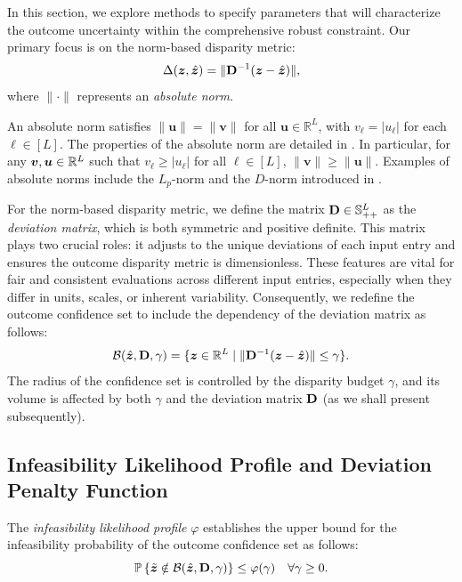 \documentclass[opre, nonblindrev]{informswp}
\newcommand{\1}[1]{\mathds{1}{\left(#1\right)}}
\begin{document}
In this section, we explore methods to specify parameters that will characterize the outcome uncertainty within the comprehensive robust constraint. Our primary focus is on the norm-based disparity metric:
$$
\Delta(\bm z,\hat{\bm{z}}) = \| {\mathbf{D}}^{-1} (\bm z - \hat{\bm{z}}) \|,
$$
where $\|\cdot\|$ represents an {\em absolute norm}. 

\begin{definition}
\textnormal{
An absolute norm satisfies $\|\bm u\| = \| \bm v\|$ for all $\bm u \in \mathbb{R}^L$, with $v_\ell = |u_\ell|$ for each $\ell \in [L]$. The properties of the absolute norm are detailed in \cite{bertsimas2006tractable}. In particular, for any $\bm v, \bm u \in \mathbb{R}^L$ such that $v_\ell\geq |u_\ell|$ for all $\ell \in [L]$, $\|\bm v\|\geq \|\bm u\|$. Examples of absolute norms include the $L_p$-norm and the $D$-norm introduced in \cite{bertsimas2004robust}.
}
\end{definition}

For the norm-based disparity metric, we define the matrix ${\mathbf{D}} \in \mathbb{S}^L_{++}$ as the {\em deviation matrix}, which is both symmetric and positive definite. This matrix plays two crucial roles: it adjusts to the unique deviations of each input entry and ensures the outcome disparity metric is dimensionless. These features are vital for fair and consistent evaluations across different input entries, especially when they differ in units, scales, or inherent variability. Consequently, we redefine the outcome confidence set to include the dependency of the deviation matrix as follows:
$$
\mathcal{B}(\hat{\bm{z}}, {\mathbf{D}}, \gamma) = \{ \bm z \in \mathbb{R}^L \;|\; \| {\mathbf{D}}^{-1} (\bm z - \hat{\bm{z}}) \| \leq \gamma \}.
$$
The radius of the confidence set is controlled by the disparity budget $\gamma$, and its volume is affected by both $\gamma$ and the deviation matrix ${\mathbf{D}}$ (as we shall present subsequently).

\subsection*{Infeasibility Likelihood Profile and Deviation Penalty Function}

The \textit{infeasibility likelihood  profile} $\varphi$ establishes the upper bound for the infeasibility probability of the outcome confidence set as follows:
$$
\mathbb{P}\left\{\tilde{\bm{z}} \notin \mathcal{B}(\hat{\bm{z}},{\mathbf{D}}, \gamma)\right\} \leq \varphi(\gamma) ~~~\forall \gamma \geq 0.
$$
\end{document}
